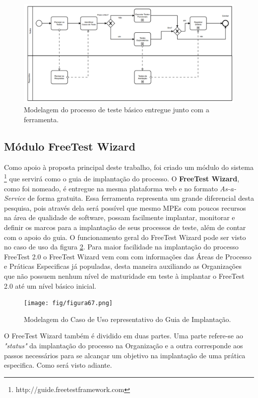 \begin{figure}[H]
\centering
\includegraphics[width=.90\textwidth]{fig/figura66.png}
\caption{Modelagem do processo de teste básico entregue junto com a ferramenta.}
\label{fig:fig66}
\end{figure}

\subsection{Módulo FreeTest Wizard}
\label{sec:oguiadeimplantacao}

Como apoio à proposta principal deste trabalho, foi criado um módulo do sistema \footnote{http://guide.freetestframework.com} que servirá como o guia de implantação do processo. O \textbf{FreeTest Wizard}, como foi nomeado, é entregue na mesma plataforma web e no formato \textit{As-a-Service} de forma gratuita. Essa ferramenta representa um grande diferencial desta pesquisa, pois através dela será possível que mesmo MPEs com poucos recursos na área de qualidade de software, possam facilmente implantar, monitorar e definir os marcos para a implantação de seus processos de teste, além de contar com o apoio do guia. O funcionamento geral do FreeTest Wizard pode ser visto no caso de uso da figura \ref{fig:fig67}. Para maior facilidade na implantação do processo FreeTest 2.0 o FreeTest Wizard vem com com informações das Áreas de Processo e Práticas Especificas já populadas, desta maneira auxiliando as Organizações que não possuem nenhum nível de maturidade em teste à implantar o FreeTest 2.0 até um nível básico inicial.

\begin{figure}[H]
\centering
\texttt{[image: fig/figura67.png]}
\caption{Modelagem do Caso de Uso representativo do Guia de Implantação.}
\label{fig:fig67}
\end{figure}

O FreeTest Wizard também é dividido em duas partes. Uma parte refere-se ao \textit{"status"} da implantação do processo na Organização e a outra corresponde aos passos necessários para se alcançar um objetivo na implantação de uma prática especifica. Como será visto adiante.

